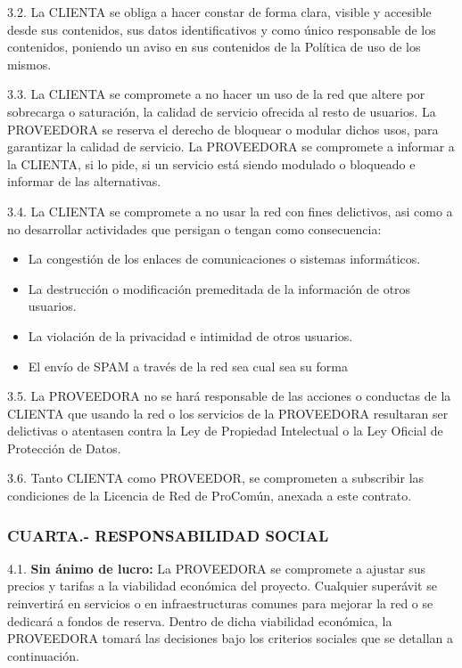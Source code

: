 \documentclass[11pt,spanish,a4paper,]{article}
\begin{document}
3.2. La CLIENTA se obliga a hacer constar de forma clara, visible y
accesible desde sus contenidos, sus datos identificativos y como único
responsable de los contenidos, poniendo un aviso en sus contenidos de la
Política de uso de los mismos.

3.3. La CLIENTA se compromete a no hacer un uso de la red que altere por
sobrecarga o saturación, la calidad de servicio ofrecida al resto de
usuarios. La PROVEEDORA se reserva el derecho de bloquear o modular
dichos usos, para garantizar la calidad de servicio. La PROVEEDORA se
compromete a informar a la CLIENTA, si lo pide, si un servicio está
siendo modulado o bloqueado e informar de las alternativas.

3.4. La CLIENTA se compromete a no usar la red con fines delictivos, asi
como a no desarrollar actividades que persigan o tengan como
consecuencia:

\begin{itemize}
\itemsep1pt\parskip0pt
\item
  La congestión de los enlaces de comunicaciones o sistemas
  informáticos.
\item
  La destrucción o modificación premeditada de la información de otros
  usuarios.
\item
  La violación de la privacidad e intimidad de otros usuarios.
\item
  El envío de SPAM a través de la red sea cual sea su forma
\end{itemize}

3.5. La PROVEEDORA no se hará responsable de las acciones o conductas de
la CLIENTA que usando la red o los servicios de la PROVEEDORA resultaran
ser delictivas o atentasen contra la Ley de Propiedad Intelectual o la
Ley Oficial de Protección de Datos.

3.6. Tanto CLIENTA como PROVEEDOR, se comprometen a subscribir las
condiciones de la Licencia de Red de ProComún, anexada a este contrato.

\subsubsection{CUARTA.- RESPONSABILIDAD
SOCIAL}\label{cuarta.--responsabilidad-social}

4.1. \textbf{Sin ánimo de lucro:} La PROVEEDORA se compromete a ajustar
sus precios y tarifas a la viabilidad económica del proyecto. Cualquier
superávit se reinvertirá en servicios o en infraestructuras comunes para
mejorar la red o se dedicará a fondos de reserva. Dentro de dicha
viabilidad económica, la PROVEEDORA tomará las decisiones bajo los
criterios sociales que se detallan a continuación.
\end{document}
